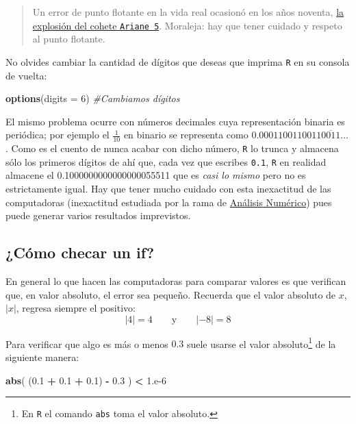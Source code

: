 \documentclass[
]{book}
\newenvironment{Shaded}{\begin{snugshade}}{\end{snugshade}}
\newcommand{\CommentTok}[1]{\textcolor[rgb]{0.56,0.35,0.01}{\textit{#1}}}
\newcommand{\DataTypeTok}[1]{\textcolor[rgb]{0.13,0.29,0.53}{#1}}
\newcommand{\DecValTok}[1]{\textcolor[rgb]{0.00,0.00,0.81}{#1}}
\newcommand{\FloatTok}[1]{\textcolor[rgb]{0.00,0.00,0.81}{#1}}
\newcommand{\KeywordTok}[1]{\textcolor[rgb]{0.13,0.29,0.53}{\textbf{#1}}}
\newcommand{\NormalTok}[1]{#1}
\newcommand{\OperatorTok}[1]{\textcolor[rgb]{0.81,0.36,0.00}{\textbf{#1}}}
\newcommand{\StringTok}[1]{\textcolor[rgb]{0.31,0.60,0.02}{#1}}
\begin{document}
\begin{quote}
Un error de punto flotante en la vida real ocasionó en los años noventa, \href{https://www.esa.int/Newsroom/Press_Releases/Ariane_501_-_Presentation_of_Inquiry_Board_report}{la explosión del cohete \texttt{Ariane\ 5}}. Moraleja: hay que tener cuidado y respeto al punto flotante.
\end{quote}

No olvides cambiar la cantidad de dígitos que deseas que imprima \texttt{R} en su consola de vuelta:

\begin{Shaded}
\begin{Highlighting}[]
\KeywordTok{options}\NormalTok{(}\DataTypeTok{digits =} \DecValTok{6}\NormalTok{) }\CommentTok{#Cambiamos dígitos}
\end{Highlighting}
\end{Shaded}

El mismo problema ocurre con números decimales cuya representación binaria es periódica; por ejemplo el \(\frac{1}{10}\) en binario se representa como \(0.0001100110011\overline{0011}\dots\). Como es el cuento de nunca acabar con dicho número, \texttt{R} lo trunca y almacena sólo los primeros dígitos de ahí que, cada vez que escribes \texttt{0.1}, \texttt{R} en realidad almacene el 0.1000000000000000055511 que es \emph{casi lo mismo} pero no es estrictamente igual. Hay que tener mucho cuidado con esta inexactitud de las computadoras (inexactitud estudiada por la rama de \href{https://www.springer.com/gp/book/9781461484523}{Análisis Numérico}) pues puede generar varios resultados imprevistos.

\hypertarget{cuxf3mo-checar-un-if}{%
\subsection{¿Cómo checar un if?}\label{cuxf3mo-checar-un-if}}

En general lo que hacen las computadoras para comparar valores es que verifican que, en valor absoluto, el error sea pequeño. Recuerda que el valor absoluto de \(x\), \(|x|\), regresa siempre el positivo:
\[
|4| = 4 \qquad \textrm{y} \qquad |-8| = 8
\]

Para verificar que algo es más o menos \(0.3\) suele usarse el valor absoluto\footnote{En \texttt{R} el comando \texttt{abs} toma el valor absoluto.} de la siguiente manera:

\begin{Shaded}
\begin{Highlighting}[]
\KeywordTok{abs}\NormalTok{( (}\FloatTok{0.1} \OperatorTok{+}\StringTok{ }\FloatTok{0.1} \OperatorTok{+}\StringTok{ }\FloatTok{0.1}\NormalTok{) }\OperatorTok{-}\StringTok{ }\FloatTok{0.3}\NormalTok{ ) }\OperatorTok{<}\StringTok{ }\DecValTok{1}\NormalTok{.e}\DecValTok{-6}
\end{Highlighting}
\end{Shaded}
\end{document}

